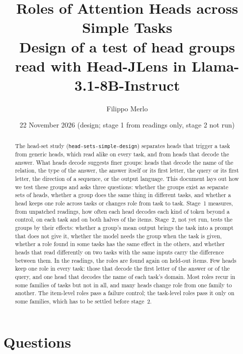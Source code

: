 \documentclass[10pt,a4paper]{article}
\title{Roles of Attention Heads across Simple Tasks\\[2pt]
\large Design of a test of head groups read with Head-JLens in Llama-3.1-8B-Instruct}
\author{Filippo Merlo}
\date{22 November 2026 (design; stage 1 from readings only, stage 2 not run)}
\newcommand{\simpledoc}{\texttt{head-sets-simple-design}}
\begin{document}
\maketitle

\begin{abstract}
The head-set study (\simpledoc) separates heads that trigger a task from generic heads, which read alike on every task, and from heads that decode the answer. What heads decode suggests finer groups: heads that decode the name of the relation, the type of the answer, the answer itself or its first letter, the query or its first letter, the direction of a sequence, or the output language. This document lays out how we test these groups and asks three questions: whether the groups exist as separate sets of heads, whether a group does the same thing in different tasks, and whether a head keeps one role across tasks or changes role from task to task. Stage~1 measures, from unpatched readings, how often each head decodes each kind of token beyond a control, on each task and on both halves of the items. Stage~2, not yet run, tests the groups by their effects: whether a group's mean output brings the task into a prompt that does not give it, whether the model needs the group when the task is given, whether a role found in some tasks has the same effect in the others, and whether heads that read differently on two tasks with the same inputs carry the difference between them. In the readings, the roles are found again on held-out items. Few heads keep one role in every task: those that decode the first letter of the answer or of the query, and one head that decodes the name of each task's domain. Most roles recur in some families of tasks but not in all, and many heads change role from one family to another. The item-level roles pass a failure control; the task-level roles pass it only on some families, which has to be settled before stage~2.
\end{abstract}

\section{Questions}\label{sec:questions}
\end{document}
